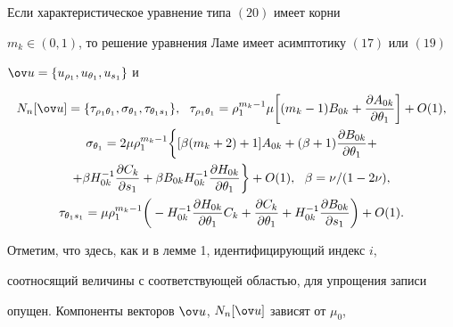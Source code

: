 \begin{lem} 


Если характеристическое уравнение типа $(20)$ имеет корни  


$m_k\in(0,1)$, то решение уравнения Ламе имеет асимптотику $(17)$ или $(19)$ 


$\ov u=\{u_{\rho_1},u_{\theta_1},u_{s_1}\}$ и  


\begin{gather} 


N_n[\ov u]=\{\tau_{\rho_1\theta_1},\sigma_{\theta_1}, 


\tau_{\theta_1s_1}\}, \ \ \tau_{\rho_1\theta_1}=\rho^{m_k-1}_1\mu 


\bigg[(m_k-1)B_{0k}+\frac{\partial A_{0k}}{\partial \theta_1}\bigg] 


+O(1),\notag \\ 


% 


\sigma_{\theta_1}=2\mu\rho^{m_k-1}_1\bigg\{[\beta(m_k+2)+1]A_{0k} 


+(\beta+1)\frac{\partial B_{0k}}{\partial \theta_1}+\notag \\ 


+\beta H^{-1}_{0k}\frac{\partial C_k}{\partial s_1} 


+\beta B_{0k}H^{-1}_{0k} 


\frac{\partial H_{0k}}{\partial \theta_1}\bigg\}+ 


O(1),\ \ \beta=\nu/(1-2\nu),\notag\\ 


% 


\tau_{\theta_1s_1}=\mu\rho^{m_k-1}_1\bigg(-H^{-1}_{0k} 


\frac{\partial H_{0k}}{\partial \theta_1}C_k+ 


\frac{\partial C_k}{\partial \theta_1}+H^{-1}_{0k} 


\frac{\partial B_{0k}}{\partial s_1}\bigg)+O(1).


\end{gather} 


\end{lem} 


 


Отметим, что здесь, как и в лемме 1, идентифицирующий индекс $i$,  


соотносящий величины с соответствующей областью, для упрощения записи  


опущен. Компоненты векторов $\ov u$, $N_n[\ov u]$ зависят от $\mu_0$, 


